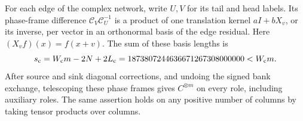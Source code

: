 \begin{proposition}\label{prop:complex-motif-interface}
For each edge of the complex network, write $U,V$ for its tail and
head labels.  Its phase-frame difference
$\mathcal C_V\mathcal C_U^{-1}$ is a product of one translation
kernel $aI+bX_v$, or its inverse, per vector in an orthonormal basis
of the edge residual.  Here $(X_vf)(x)=f(x+v)$.
The sum of these basis lengths is
\[
 s_{\rm c}=W_{\rm c}m-2N+2L_{\rm c}
 =1873807244636671267308000000<W_{\rm c}m.
\]
After source and sink diagonal corrections, and undoing the signed
bank exchange, telescoping these phase frames gives $C^{\otimes m}$
on every role, including auxiliary roles.  The same assertion holds
on any positive number of columns by taking tensor products over columns.
\end{proposition}

